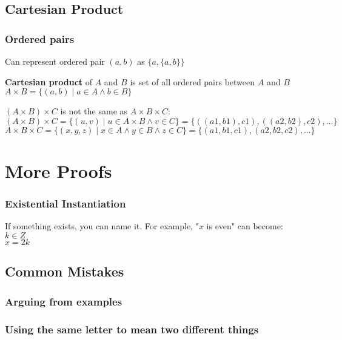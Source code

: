 \documentclass[12pt]{article}
\newcommand{\set}[1]{\{#1\}}
\begin{document}
\subsection*{Cartesian Product}

\subsubsection*{Ordered pairs}

Can represent ordered pair $(a, b)$ as $\set{a, \set{a, b}}$

\textbf{Cartesian product} of $A$ and $B$ is set of all ordered pairs between $A$ and $B$\\
$A \times B = \set{(a, b) \mid a \in A \land b \in B}$

$(A \times B) \times C$ is not the same as $A \times B \times C$:\\
$(A \times B) \times C = \set{(u, v) \mid u \in A \times B \land v \in C} = \set{((a1, b1), c1), ((a2, b2), c2), ...}$\\
$A \times B \times C = \set{(x, y, z) \mid x \in A \land y \in B \land z \in C} = \set{(a1, b1, c1), (a2, b2, c2), ...}$

\section*{More Proofs}

\subsubsection*{Existential Instantiation}

If something exists, you can name it. For example, "$x$ is even" can become:\\
$k \in Z$\\
$x = 2k$

\subsection*{Common Mistakes}

\subsubsection*{Arguing from examples}

\subsubsection*{Using the same letter to mean two different things}
\end{document}
